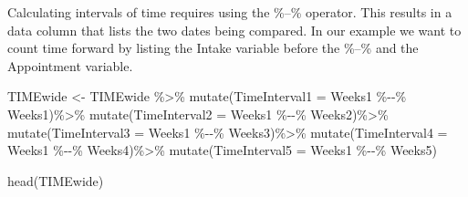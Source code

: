 \documentclass[
  11pt,
]{book}
\newenvironment{Shaded}{\begin{snugshade}}{\end{snugshade}}
\newcommand{\AttributeTok}[1]{\textcolor[rgb]{0.77,0.63,0.00}{#1}}
\newcommand{\FunctionTok}[1]{\textcolor[rgb]{0.00,0.00,0.00}{#1}}
\newcommand{\NormalTok}[1]{#1}
\newcommand{\OtherTok}[1]{\textcolor[rgb]{0.56,0.35,0.01}{#1}}
\newcommand{\SpecialCharTok}[1]{\textcolor[rgb]{0.00,0.00,0.00}{#1}}
\begin{document}
Calculating intervals of time requires using the \%--\% operator. This results in a data column that lists the two dates being compared. In our example we want to count time forward by listing the Intake variable before the \%--\% and the Appointment variable.

\begin{Shaded}
\begin{Highlighting}[]
\NormalTok{TIMEwide }\OtherTok{\textless{}{-}}\NormalTok{ TIMEwide }\SpecialCharTok{\%\textgreater{}\%}
  \FunctionTok{mutate}\NormalTok{(}\AttributeTok{TimeInterval1 =}\NormalTok{ Weeks1 }\SpecialCharTok{\%{-}{-}\%}\NormalTok{ Weeks1)}\SpecialCharTok{\%\textgreater{}\%}
  \FunctionTok{mutate}\NormalTok{(}\AttributeTok{TimeInterval2 =}\NormalTok{ Weeks1 }\SpecialCharTok{\%{-}{-}\%}\NormalTok{ Weeks2)}\SpecialCharTok{\%\textgreater{}\%}
  \FunctionTok{mutate}\NormalTok{(}\AttributeTok{TimeInterval3 =}\NormalTok{ Weeks1 }\SpecialCharTok{\%{-}{-}\%}\NormalTok{ Weeks3)}\SpecialCharTok{\%\textgreater{}\%}
  \FunctionTok{mutate}\NormalTok{(}\AttributeTok{TimeInterval4 =}\NormalTok{ Weeks1 }\SpecialCharTok{\%{-}{-}\%}\NormalTok{ Weeks4)}\SpecialCharTok{\%\textgreater{}\%}
  \FunctionTok{mutate}\NormalTok{(}\AttributeTok{TimeInterval5 =}\NormalTok{ Weeks1 }\SpecialCharTok{\%{-}{-}\%}\NormalTok{ Weeks5)}

\FunctionTok{head}\NormalTok{(TIMEwide)}
\end{Highlighting}
\end{Shaded}
\end{document}
